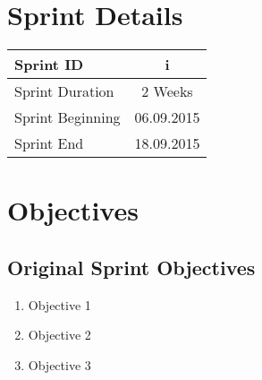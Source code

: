 \documentclass[10pt, b5paper]{article}
\begin{document}
\title{\rmfamily\normalfont{}}

\author{{\small PROJECT NAME}}

\date{\footnotesize{\today}}

\maketitle

% 
 


\section{Sprint Details}
\begin{center}
\begin{tabular}{ l | c }
\hline 
Sprint ID & i  \\ %
\hline 
Sprint Duration & 2 Weeks \\ %
\hline 
Sprint Beginning & 06.09.2015 \\ %
\hline 
Sprint End & 18.09.2015 \\ %
\hline 
\end{tabular}
\end{center}

\section{Objectives}
\subsection{Original Sprint Objectives}
\begin{enumerate}
\item Objective 1
\item Objective 2
\item Objective 3
\end{enumerate}
\end{document}
